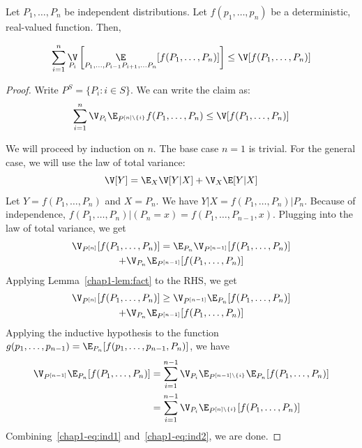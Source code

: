 \begin{lemma}\label{chap1-lem:variance-sum}
Let $P_1, \ldots, P_n$ be independent distributions. Let $f(p_1, \ldots, p_n)$
be a deterministic, real-valued function. Then, 

\[
    \sum_{i=1}^n \mathop{\V}_{P_i}\left[ \mathop{\E}_{P_1, \ldots, P_{i-1} P_{i+1}, \ldots P_n} [f(P_1,\ldots, P_n)] \right] \leq \V[f(P_1,\ldots, P_n)]
\]
\end{lemma}
\begin{proof}
Write $P^{S} = \{ P_i : i \in S\}$. We can write the claim as:
\[
    \sum_{i=1}^n \V_{P_i} \E_{P^{[n]\setminus\{i\}}} f(P_1,\ldots, P_n) \leq \V[f(P_1,\ldots, P_n)]
\]

We will proceed by induction on $n$. The base case $n=1$ is trivial. For the general case, we will use the law of total variance:
\[
\V[Y] = \E_X \V[Y | X] + \V_X \E[Y|X]
\]
Let $Y = f(P_1, \ldots, P_n)$ and $X = P_n$. We have $Y | X = f(P_1,\ldots, P_n)|P_n$. Because of independence, $f(P_1,\ldots, P_n)|(P_n=x) = f(P_1,\ldots, P_{n-1},x)$. Plugging into the law of total variance, we get
\begin{multline*}
    \V_{P^{[n]}}[f(P_1, \ldots, P_n)] = \E_{P_n}\V_{P^{[n-1]}}[f(P_1, \ldots,
    P_n)] \\ +  \V_{P_n}\E_{P^{[n-1]}}[f(P_1, \ldots, P_n)]
\end{multline*}
Applying Lemma~\ref{chap1-lem:fact} to the RHS, we get
\begin{multline}\label{chap1-eq:ind1}
  \V_{P^{[n]}}[f(P_1,\ldots,P_n)] \geq \V_{P^{[n-1]}}\E_{P_n}[f(P_1, \ldots,
  P_n)] \\ + \V_{P_n} \E_{P^{[n-1]}}[f(P_1, \ldots, P_n)]
\end{multline}
Applying the inductive hypothesis to the function $g(p_1, \ldots, p_{n-1}) = \E_{P_n}[f(p_1, \ldots, p_{n-1}, P_n)]$, we have
\begin{align}
\V_{P^{[n-1]}}\E_{P_n}[f(P_1, \ldots, P_n)] &= \sum_{i=1}^{n-1} \V_{P_i} \E_{P^{[n-1]\setminus\{i\}}} \E_{P_n}[f(P_1,\ldots,P_n)] \nonumber \\
&= \sum_{i=1}^{n-1} \V_{P_i} \E_{P^{[n]\setminus\{i\}}} [f(P_1,\ldots,P_n)] \label{chap1-eq:ind2}
\end{align}
Combining~\eqref{chap1-eq:ind1} and~\eqref{chap1-eq:ind2}, we are done.
\end{proof}

